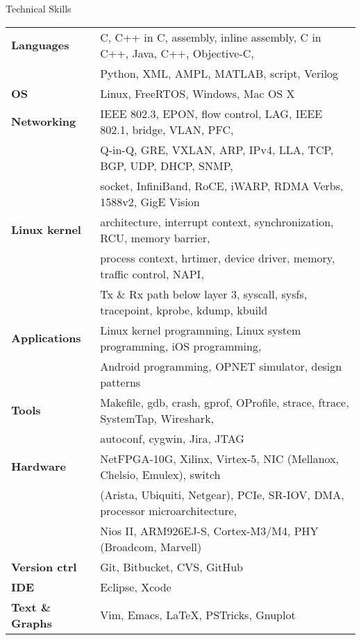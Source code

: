 \documentclass{resume} %
\begin{document}
\begin{rSection}{Technical Skills}


\begin{tabular}{ @{} >{\bfseries}l @{\hspace{3ex}} l }
Languages & C, C++ in C, assembly, inline assembly, C in C++, Java, C++, Objective-C, \\
& Python, XML, AMPL, MATLAB, script, Verilog \\
OS & Linux, FreeRTOS, Windows, Mac OS X \\
Networking & IEEE 802.3, EPON, flow control, LAG, IEEE 802.1, bridge, VLAN, PFC, \\
& Q-in-Q, GRE, VXLAN, ARP, IPv4, LLA, TCP, BGP, UDP, DHCP, SNMP, \\
& socket, InfiniBand, RoCE, iWARP, RDMA Verbs, 1588v2, GigE Vision \\
Linux kernel & architecture, interrupt context, synchronization, RCU, memory barrier, \\
& process context, hrtimer, device driver, memory, traffic control, NAPI, \\
& Tx \& Rx path below layer 3, syscall, sysfs, tracepoint, kprobe, kdump, kbuild \\
Applications & Linux kernel programming, Linux system programming, iOS programming, \\
& Android programming, OPNET simulator, design patterns \\
Tools & Makefile, gdb, crash, gprof, OProfile, strace, ftrace, SystemTap, Wireshark, \\
& autoconf, cygwin, Jira, JTAG \\
Hardware & NetFPGA-10G, Xilinx, Virtex-5, NIC (Mellanox, Chelsio, Emulex), switch \\
& (Arista, Ubiquiti, Netgear), PCIe, SR-IOV, DMA, processor microarchitecture, \\
& Nios II, ARM926EJ-S, Cortex-M3/M4, PHY (Broadcom, Marvell) \\
Version ctrl & Git, Bitbucket, CVS, GitHub \\
IDE & Eclipse, Xcode  \\
Text \& Graphs & Vim, Emacs, \LaTeX, PSTricks, Gnuplot
\end{tabular}

\end{rSection}
\end{document}
